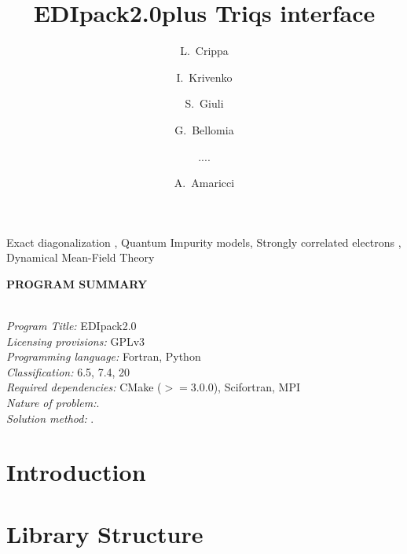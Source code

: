 \documentclass[final,3p,10pt]{elsarticle}
\def\NAME{{\rm EDIpack2.0}}
\begin{document}
\begin{frontmatter}

\title{\NAME plus Triqs interface}
\author[]{L.~Crippa}
\author[]{I.~Krivenko}
\author[]{S.~Giuli}
\author[]{G.~Bellomia}
\author[]{....}
\author[a]{A.~Amaricci}


\address[a]{CNR-IOM, Istituto Officina dei Materiali,
    Consiglio Nazionale delle Ricerche, Via Bonomea 265, 34136 Trieste, Italy}
\begin{abstract}
  
\end{abstract}

\begin{keyword}
  Exact diagonalization \sep
  Quantum Impurity models\sep  
  Strongly correlated electrons \sep  
  Dynamical Mean-Field Theory
\end{keyword}

\end{frontmatter}

\noindent
{\bf PROGRAM SUMMARY}
\begin{small}
  \noindent
  \\
  {\em Program Title:}  \NAME                                        \\
{\em Licensing provisions:} GPLv3\\
{\em Programming language:}  Fortran, Python \\
{\em Classification:} 6.5, 7.4, 20 \\
{\em Required dependencies:} CMake ($>=3.0.0$), Scifortran, MPI\\
{\em Nature of problem:}. \\
{\em Solution method:} .\\
\end{small}

\section{Introduction}\label{SecIntro}


\section{Library Structure}\label{SecStruct}
\end{document}

